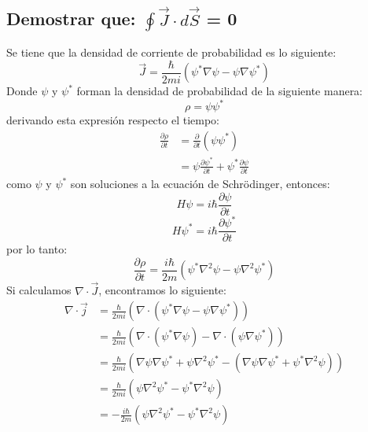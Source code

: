 \documentclass[12pt,letterpaper]{report}
\begin{document}
\subsection*{Demostrar que: $\oint \vec{J} \cdot d\vec{S}$ = 0}
Se tiene que la densidad de corriente de probabilidad es lo siguiente:
\begin{equation}
    \vec{J} = \frac{\hbar }{2mi}\left(\psi^* \nabla \psi-\psi \nabla \psi^* \right)
    \label{eq:j}
\end{equation}
Donde $\psi$ y $\psi^*$ forman la densidad de probabilidad de la siguiente manera:
\begin{equation}
    \rho= \psi \psi^*
\end{equation}
derivando esta expresión respecto el tiempo:
\begin{align*}
    \frac{\partial \rho}{\partial t}    &= \frac{\partial}{\partial t}\left(\psi \psi^*  \right)\\
                                        &=\psi \frac{\partial \psi^* }{\partial t} + \psi^* \frac{\partial \psi}{\partial t}
\end{align*}
como $\psi$ y $\psi^* $ son soluciones a la ecuación de Schr\"odinger, entonces:
\begin{equation}
    H\psi =i \hbar \frac{\partial \psi}{\partial t}
    \label{eq:hpsi}
\end{equation}
\begin{equation}
    H\psi^* =i \hbar \frac{\partial \psi^*}{\partial t}
    \label{eq:hpsi*}
\end{equation}
por lo tanto:
\begin{equation}
    \frac{\partial \rho}{ \partial t} = \frac{i\hbar}{2m} \left(\psi^* \nabla^2 \psi - \psi \nabla^2 \psi^* \right)
    \label{eq:partialrho}
\end{equation}
Si calculamos $\nabla \cdot \vec{J}$, encontramos lo siguiente:
\begin{align*}
    \nabla \cdot \vec{j}    &= \frac{\hbar}{2mi} (\nabla \cdot (\psi^* \nabla \psi - \psi \nabla \psi^*))\\
                            &= \frac{\hbar}{2mi} (\nabla \cdot(\psi^* \nabla \psi) - \nabla \cdot (\psi \nabla \psi^*))\\
                            &= \frac{\hbar}{2mi} (\nabla \psi \nabla \psi^* + \psi \nabla^2 \psi^* - (\nabla \psi \nabla \psi^* + \psi^* \nabla^2 \psi))\\
                            &=\frac{\hbar}{2mi}(\psi \nabla^2 \psi^* - \psi^* \nabla^2 \psi)\\
                            &= -\frac{i\hbar}{2m} (\psi \nabla^2 \psi^* - \psi^* \nabla^2 \psi)
\end{align*}
\end{document}
